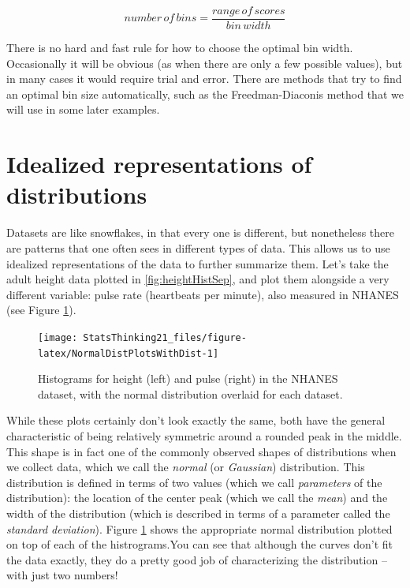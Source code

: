 \documentclass[
  12pt,
]{book}
\begin{document}
\[
number\, of\, bins  = \frac{range\, of\, scores}{bin\, width}
\]

There is no hard and fast rule for how to choose the optimal bin width. Occasionally it will be obvious (as when there are only a few possible values), but in many cases it would require trial and error. There are methods that try to find an optimal bin size automatically, such as the Freedman-Diaconis method that we will use in some later examples.

\hypertarget{idealized-representations-of-distributions}{%
\section{Idealized representations of distributions}\label{idealized-representations-of-distributions}}

Datasets are like snowflakes, in that every one is different, but nonetheless there are patterns that one often sees in different types of data. This allows us to use idealized representations of the data to further summarize them. Let's take the adult height data plotted in \ref{fig:heightHistSep}, and plot them alongside a very different variable: pulse rate (heartbeats per minute), also measured in NHANES (see Figure \ref{fig:NormalDistPlotsWithDist}).

\begin{figure}
\texttt{[image: StatsThinking21\_files/figure-latex/NormalDistPlotsWithDist-1]} \caption{Histograms for height (left) and pulse (right) in the NHANES dataset, with the normal distribution overlaid for each dataset.}\label{fig:NormalDistPlotsWithDist}
\end{figure}

While these plots certainly don't look exactly the same, both have the general characteristic of being relatively symmetric around a rounded peak in the middle. This shape is in fact one of the commonly observed shapes of distributions when we collect data, which we call the \emph{normal} (or \emph{Gaussian}) distribution. This distribution is defined in terms of two values (which we call \emph{parameters} of the distribution): the location of the center peak (which we call the \emph{mean}) and the width of the distribution (which is described in terms of a parameter called the \emph{standard deviation}). Figure \ref{fig:NormalDistPlotsWithDist} shows the appropriate normal distribution plotted on top of each of the histrograms.You can see that although the curves don't fit the data exactly, they do a pretty good job of characterizing the distribution -- with just two numbers!
\end{document}
